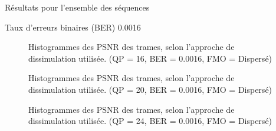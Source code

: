 \begin{section}{Résultats pour l'ensemble des séquences}
\begin{subsection}{Taux d'erreurs binaires (BER) 0.0016}
\begin{figure} 
\caption[]{Histogrammes des PSNR des trames, selon l'approche de dissimulation
utilisée. (QP = 16, BER = 0.0016, FMO = Dispersé)}
\label{fig-HistAllDispersed16x16}
\end{figure}

\begin{figure} 
\caption[]{Histogrammes des PSNR des trames, selon l'approche de dissimulation
utilisée. (QP = 20, BER = 0.0016, FMO = Dispersé)}
\label{fig-HistAllDispersed20x16}
\end{figure}

\begin{figure} 
\caption[]{Histogrammes des PSNR des trames, selon l'approche de dissimulation
utilisée. (QP = 24, BER = 0.0016, FMO = Dispersé)}
\label{fig-HistAllDispersed24x8}
\end{figure}


\end{subsection}
\end{section}
